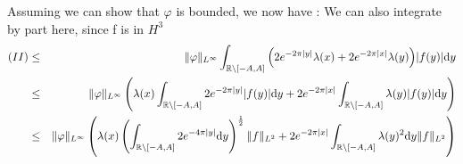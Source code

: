 \documentclass[11pt,a4paper]{article}
\begin{document}
Assuming we can show that $\varphi$ is bounded, we now have :
 We can also integrate by part here, since f is in $H^3$
\begin{eqnarray*}
(II) &\leq& \|\varphi\|_{L^\infty} \int_{\mathbb R \setminus [-A,A]} \Big( 2e^{-2\pi|y|}\lambda(x)+2e^{-2\pi|x|}\lambda(y)\Big)|f(y)|\mathrm{d}y \\
&\leq&  \|\varphi\|_{L^\infty} \left( \lambda(x) \int_{\mathbb R \setminus [-A,A]} 2e^{-2\pi|y|}|f(y)|\mathrm{d}y +   2e^{-2\pi|x|}\int_{\mathbb R \setminus [-A,A]} \lambda(y)|f(y)|\mathrm{d}y\right)\\
&\leq&  \|\varphi\|_{L^\infty} \left( \lambda(x) \left(\int_{\mathbb R \setminus [-A,A]} 2e^{-4\pi|y|}\mathrm{d}y\right)^\frac{1}{2} \|f\|_{L^2} +   2e^{-2\pi|x|}\int_{\mathbb R \setminus [-A,A]} \lambda(y)^2\mathrm{d}y\|f\|_{L^2}\right)\\
\end{eqnarray*}

\newpage
\printbibliography[heading=bibintoc]
\newpage
\appendix
\end{document}
